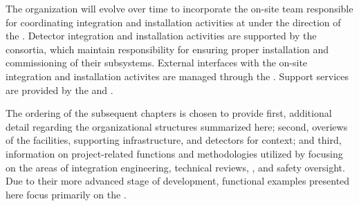 The  organization will evolve over time to incorporate the
on-site team responsible for coordinating integration and installation
activities at  under the direction of the .
Detector integration and installation activities are supported by the
 consortia, which maintain responsibility for ensuring
proper installation and commissioning of their subsystems.  External
 interfaces with the on-site integration and installation
activites are managed through the . Support services are
provided by the  and .

The ordering of the subsequent chapters is chosen to provide first,  
additional detail regarding the organizational structures summarized 
here; second, overiews of the facilities, supporting infrastructure, 
and detectors for context; and third, information on project-related 
functions and methodologies utilized by   
focusing on the areas of integration engineering, technical reviews, 
, and safety oversight.  Due to their more advanced stage 
of development, functional examples presented here focus primarily on 
the  .
